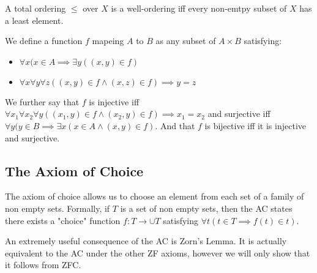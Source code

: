 \documentclass[]{article}
\begin{document}

\begin{defi} 
	A total ordering $\leq$ over $X$ is a well-ordering iff every non-emtpy subset of $X$ has a least element.
\end{defi}

\begin{defi} [Function]

		We define a function $f$ mapeing $A$ to $B$ as any subset of $A \times B$ satisfying:
		\begin{itemize}
		\item $\forall x(x \in A \implies \exists y ((x,y) \in f)$
		\item $\forall x \forall y \forall z((x, y) \in f \land (x, z) \in f) \implies y = z$	
		\end{itemize}	

		We further say that $f$ is injective iff $\forall x_1 \forall x_2 \forall y((x_1, y) \in f \land (x_2, y) \in f) \implies x_1 = x_2$ and surjective iff $\forall y (y \in B \implies \exists x (x \in A \land (x,y) \in f)$. And that  $f$ is bijective iff it is injective and surjective.
\end{defi}

\subsection{The Axiom of Choice}

The axiom of choice allows us to choose an element from each set of a family of non empty sets. Formally, if $T$ is a set of non empty sets, then the AC states there exists a "choice" function $f: T \to \cup T$ satisfying $\forall t(t \in T \implies f(t) \in t)$.

An extremely useful consequence of the AC is Zorn's Lemma. It is actually equivalent to the AC under the other ZF axioms, however we will only show that it follows from ZFC.
\end{document}
